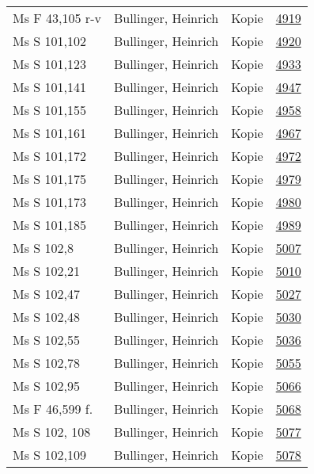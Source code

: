 \documentclass[10pt,a4paper,landscape]{report}
\begin{document}
\begin{longtable}{p{16cm}p{4cm}lr}
Ms F 43,105 r-v	&	Bullinger, Heinrich	&	Kopie	&	\href{http://130.60.24.72/assignment/4919}{4919}\\
Ms S 101,102	&	Bullinger, Heinrich	&	Kopie	&	\href{http://130.60.24.72/assignment/4920}{4920}\\
Ms S 101,123	&	Bullinger, Heinrich	&	Kopie	&	\href{http://130.60.24.72/assignment/4933}{4933}\\
Ms S 101,141	&	Bullinger, Heinrich	&	Kopie	&	\href{http://130.60.24.72/assignment/4947}{4947}\\
Ms S 101,155	&	Bullinger, Heinrich	&	Kopie	&	\href{http://130.60.24.72/assignment/4958}{4958}\\
Ms S 101,161	&	Bullinger, Heinrich	&	Kopie	&	\href{http://130.60.24.72/assignment/4967}{4967}\\
Ms S 101,172	&	Bullinger, Heinrich	&	Kopie	&	\href{http://130.60.24.72/assignment/4972}{4972}\\
Ms S 101,175	&	Bullinger, Heinrich	&	Kopie	&	\href{http://130.60.24.72/assignment/4979}{4979}\\
Ms S 101,173	&	Bullinger, Heinrich	&	Kopie	&	\href{http://130.60.24.72/assignment/4980}{4980}\\
Ms S 101,185	&	Bullinger, Heinrich	&	Kopie	&	\href{http://130.60.24.72/assignment/4989}{4989}\\
Ms S 102,8	&	Bullinger, Heinrich	&	Kopie	&	\href{http://130.60.24.72/assignment/5007}{5007}\\
Ms S 102,21	&	Bullinger, Heinrich	&	Kopie	&	\href{http://130.60.24.72/assignment/5010}{5010}\\
Ms S 102,47	&	Bullinger, Heinrich	&	Kopie	&	\href{http://130.60.24.72/assignment/5027}{5027}\\
Ms S 102,48	&	Bullinger, Heinrich	&	Kopie	&	\href{http://130.60.24.72/assignment/5030}{5030}\\
Ms S 102,55	&	Bullinger, Heinrich	&	Kopie	&	\href{http://130.60.24.72/assignment/5036}{5036}\\
Ms S 102,78	&	Bullinger, Heinrich	&	Kopie	&	\href{http://130.60.24.72/assignment/5055}{5055}\\
Ms S 102,95	&	Bullinger, Heinrich	&	Kopie	&	\href{http://130.60.24.72/assignment/5066}{5066}\\
Ms F 46,599 f.	&	Bullinger, Heinrich	&	Kopie	&	\href{http://130.60.24.72/assignment/5068}{5068}\\
Ms S 102, 108	&	Bullinger, Heinrich	&	Kopie	&	\href{http://130.60.24.72/assignment/5077}{5077}\\
Ms S 102,109	&	Bullinger, Heinrich	&	Kopie	&	\href{http://130.60.24.72/assignment/5078}{5078}\\

\end{longtable}
\end{document}
